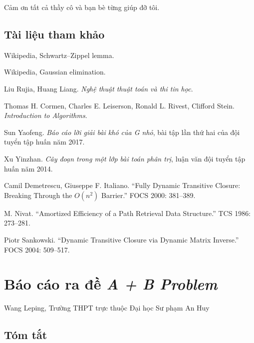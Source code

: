 \documentclass[11pt]{article}
\begin{document}
Cảm ơn tất cả thầy cô và bạn bè từng giúp đỡ tôi.

\subsection*{Tài liệu tham khảo}

\begin{enumerate}[label={[\arabic*]}]
  \item Wikipedia, Schwartz--Zippel lemma.

  \item Wikipedia, Gaussian elimination.

  \item Liu Rujia, Huang Liang. \emph{Nghệ thuật thuật toán và thi tin học}.

  \item Thomas H. Cormen, Charles E. Leiserson, Ronald L. Rivest, Clifford
  Stein. \emph{Introduction to Algorithms}.

  \item Sun Yaofeng. \emph{Báo cáo lời giải bài khó của G nhỏ}, bài tập lần
  thứ hai của đội tuyển tập huấn năm 2017.

  \item Xu Yinzhan. \emph{Cây đoạn trong một lớp bài toán phân trị}, luận văn
  đội tuyển tập huấn năm 2014.

  \item Camil Demetrescu, Giuseppe F. Italiano. ``Fully Dynamic Transitive
  Closure: Breaking Through the \(O(n^2)\) Barrier.'' FOCS 2000: 381--389.

  \item M. Nivat. ``Amortized Efficiency of a Path Retrieval Data Structure.''
  TCS 1986: 273--281.

  \item Piotr Sankowski. ``Dynamic Transitive Closure via Dynamic Matrix
  Inverse.'' FOCS 2004: 509--517.
\end{enumerate}

\section{Báo cáo ra đề \texorpdfstring{\emph{A + B Problem}}{A + B Problem}}

\begin{center}
Wang Leping, Trường THPT trực thuộc Đại học Sư phạm An Huy
\end{center}

\subsection*{Tóm tắt}
\end{document}
